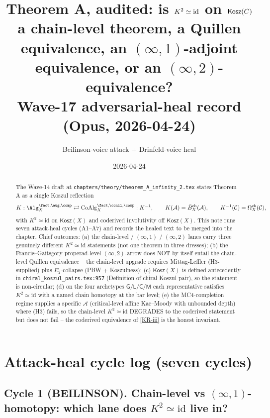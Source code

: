 \documentclass[11pt]{article}
\title{Theorem A, audited: is $K^{2}\simeq\id$ on $\Kosz(C)$ a
  chain-level theorem, a Quillen equivalence, an $(\infty,1)$-adjoint
  equivalence, or an $(\infty,2)$-equivalence? \\
  \small Wave-17 adversarial-heal record (Opus, 2026-04-24)}
\author{Beilinson-voice attack + Drinfeld-voice heal}
\date{2026-04-24}
\theoremstyle{definition}
\newcommand{\Bbarch}{\bar B^{\mathrm{ch}}}
\newcommand{\Omegach}{\Omega^{\mathrm{ch}}}
\newcommand{\Kosz}{\mathsf{Kosz}}
\newcommand{\id}{\mathrm{id}}
\newcommand{\cA}{\mathcal{A}}
\newcommand{\cC}{\mathcal{C}}
\begin{document}
\maketitle

\begin{abstract}
The Wave-14 draft at \texttt{chapters/theory/theorem\_A\_infinity\_2.tex}
states Theorem A as a single Koszul reflection
\[
K:\Alg_X^{\fact,\aug,\comp}\rightleftarrows\mathrm{CoAlg}_X^{\fact,\conil,\comp}:K^{-1},
\qquad K(\cA)=\Bbarch_X(\cA),
\qquad K^{-1}(\cC)=\Omegach_X(\cC),
\]
with $K^{2}\simeq\id$ on $\Kosz(X)$ and coderived involutivity off
$\Kosz(X)$. This note runs seven attack-heal cycles (A1--A7) and
records the healed text to be merged into the chapter. Chief
outcomes: (a) the chain-level / $(\infty,1)$ / $(\infty,2)$ lanes
carry three genuinely different $K^{2}\simeq\id$ statements (not one
theorem in three dresses); (b) the Francis--Gaitsgory properad-level
$(\infty,2)$-arrow does NOT by itself entail the chain-level Quillen
equivalence -- the chain-level upgrade requires Mittag-Leffler
(H3-supplied) plus $E_2$-collapse (PBW + Koszulness); (c) $\Kosz(X)$
is defined antecedently in \texttt{chiral\_koszul\_pairs.tex:957}
(Definition of chiral Koszul pair), so the statement is
non-circular; (d) on the four archetypes $\mathsf{G}/\mathsf{L}/\mathsf{C}/\mathsf{M}$
each representative satisfies $K^{2}\simeq\id$ with a named chain
homotopy at the bar level; (e) the MC4-completion regime supplies a
specific $\cA$ (critical-level affine Kac--Moody with unbounded
depth) where (H3) fails, so the chain-level $K^{2}\simeq\id$
DEGRADES to the coderived statement but does not fail -- the
coderived equivalence of \ref{KR-iii} is the honest invariant.
\end{abstract}

\section*{Attack-heal cycle log (seven cycles)}

\subsection*{Cycle 1 (BEILINSON). Chain-level vs $(\infty,1)$-homotopy: which lane does $K^{2}\simeq\id$ live in?}
\end{document}
